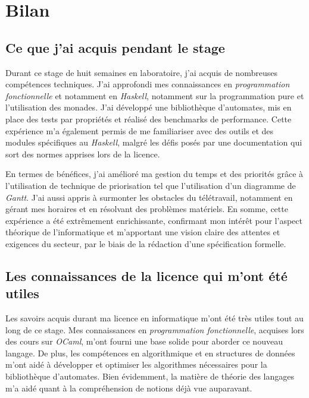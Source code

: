 \section{Bilan}

\subsection{Ce que j'ai acquis pendant le stage}

Durant ce stage de huit semaines en laboratoire, j'ai acquis de nombreuses 
compétences techniques. J'ai approfondi mes connaissances en 
\textit{programmation fonctionnelle} et notamment en \textit{Haskell}, notamment 
sur la programmation pure et l'utilisation des monades. J'ai développé une 
bibliothèque d'automates, mis en place des tests par propriétés et réalisé des 
benchmarks de performance. Cette expérience m'a également permis de me 
familiariser avec des outils et des modules spécifiques au \textit{Haskell}, 
malgré les défis posés par une documentation qui sort des normes apprises lors 
de la licence. 

\vphantom{}

En termes de bénéfices, j'ai amélioré ma gestion du temps et des priorités grâce 
à l'utilisation de technique de priorisation tel que l'utilisation d'un 
diagramme de \textit{Gantt}. J'ai aussi appris à surmonter les obstacles du 
télétravail, notamment en gérant mes horaires et en résolvant des problèmes 
matériels. En somme, cette expérience a été extrêmement enrichissante, 
confirmant mon intérêt pour l'aspect théorique de l'informatique et m'apportant 
une vision claire des attentes et exigences du secteur, par le biais de la 
rédaction d'une spécification formelle.

\subsection{Les connaissances de la licence qui m'ont été utiles}

Les savoirs acquis durant ma licence en informatique m'ont été très utiles tout 
au long de ce stage. Mes connaissances en \textit{programmation fonctionnelle}, 
acquises lors des cours sur \textit{OCaml}, m'ont fourni une base solide pour 
aborder ce nouveau langage. De plus, les compétences en algorithmique et en 
structures de données m'ont aidé à développer et optimiser les algorithmes 
nécessaires pour la bibliothèque d'automates. Bien évidemment, la matière de 
théorie des langages m'a aidé quant à la compréhension de notions déjà vue 
auparavant.

